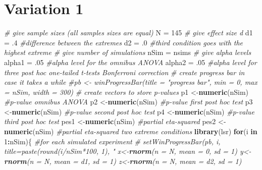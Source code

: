 \documentclass[]{book}
\newenvironment{Shaded}{\begin{snugshade}}{\end{snugshade}}
\newcommand{\CommentTok}[1]{\textcolor[rgb]{0.56,0.35,0.01}{\textit{#1}}}
\newcommand{\ControlFlowTok}[1]{\textcolor[rgb]{0.13,0.29,0.53}{\textbf{#1}}}
\newcommand{\DataTypeTok}[1]{\textcolor[rgb]{0.13,0.29,0.53}{#1}}
\newcommand{\DecValTok}[1]{\textcolor[rgb]{0.00,0.00,0.81}{#1}}
\newcommand{\FloatTok}[1]{\textcolor[rgb]{0.00,0.00,0.81}{#1}}
\newcommand{\KeywordTok}[1]{\textcolor[rgb]{0.13,0.29,0.53}{\textbf{#1}}}
\newcommand{\NormalTok}[1]{#1}
\newcommand{\OperatorTok}[1]{\textcolor[rgb]{0.81,0.36,0.00}{\textbf{#1}}}
\newcommand{\StringTok}[1]{\textcolor[rgb]{0.31,0.60,0.02}{#1}}
\begin{document}
\hypertarget{variation-1}{%
\section{Variation 1}\label{variation-1}}

\begin{Shaded}
\begin{Highlighting}[]
\CommentTok{# give sample sizes (all samples sizes are equal)}
\NormalTok{N =}\StringTok{ }\DecValTok{145}
\CommentTok{# give effect size d}
\NormalTok{d1 =}\StringTok{ }\FloatTok{.4} \CommentTok{#difference between the extremes}
\NormalTok{d2 =}\StringTok{ }\FloatTok{.0} \CommentTok{#third condition goes with the highest extreme}
\CommentTok{# give number of simulations}
\NormalTok{nSim =}\StringTok{ }\NormalTok{nsims}
\CommentTok{# give alpha levels}
\NormalTok{alpha1 =}\StringTok{ }\FloatTok{.05} \CommentTok{#alpha level for the omnibus ANOVA}
\NormalTok{alpha2 =}\StringTok{ }\FloatTok{.05} \CommentTok{#alpha level for three post hoc one-tailed t-tests Bonferroni correction}
\CommentTok{# create progress bar in case it takes a while}
\CommentTok{#pb <- winProgressBar(title = "progress bar", min = 0, max = nSim, width = 300)}
\CommentTok{# create vectors to store p-values}
\NormalTok{p1 <-}\KeywordTok{numeric}\NormalTok{(nSim) }\CommentTok{#p-value omnibus ANOVA}
\NormalTok{p2 <-}\KeywordTok{numeric}\NormalTok{(nSim) }\CommentTok{#p-value first post hoc test}
\NormalTok{p3 <-}\KeywordTok{numeric}\NormalTok{(nSim) }\CommentTok{#p-value second post hoc test}
\NormalTok{p4 <-}\KeywordTok{numeric}\NormalTok{(nSim) }\CommentTok{#p-value third post hoc test}
\NormalTok{pes1 <-}\KeywordTok{numeric}\NormalTok{(nSim) }\CommentTok{#partial eta-squared}
\NormalTok{pes2 <-}\KeywordTok{numeric}\NormalTok{(nSim) }\CommentTok{#partial eta-squared two extreme conditions}
\KeywordTok{library}\NormalTok{(lsr)}
\ControlFlowTok{for}\NormalTok{(i }\ControlFlowTok{in} \DecValTok{1}\OperatorTok{:}\NormalTok{nSim)\{ }\CommentTok{#for each simulated experiment}
 \CommentTok{# setWinProgressBar(pb, i, title=paste(round(i/nSim*100, 1), "%
\NormalTok{  x<-}\KeywordTok{rnorm}\NormalTok{(}\DataTypeTok{n =}\NormalTok{ N, }\DataTypeTok{mean =} \DecValTok{0}\NormalTok{, }\DataTypeTok{sd =} \DecValTok{1}\NormalTok{)}
\NormalTok{  y<-}\KeywordTok{rnorm}\NormalTok{(}\DataTypeTok{n =}\NormalTok{ N, }\DataTypeTok{mean =}\NormalTok{ d1, }\DataTypeTok{sd =} \DecValTok{1}\NormalTok{) }
\NormalTok{  z<-}\KeywordTok{rnorm}\NormalTok{(}\DataTypeTok{n =}\NormalTok{ N, }\DataTypeTok{mean =}\NormalTok{ d2, }\DataTypeTok{sd =} \DecValTok{1}\NormalTok{) }
}
\end{Highlighting}
\end{Shaded}
\end{document}
